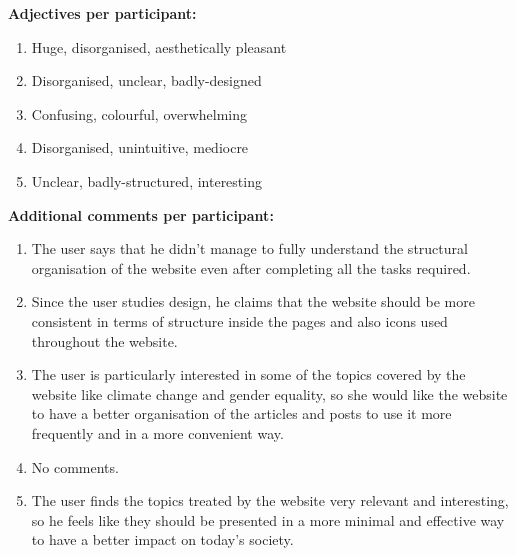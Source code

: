 \textbf{Adjectives per participant:}
\begin{enumerate}
	\item Huge, disorganised, aesthetically pleasant
	\item Disorganised, unclear, badly-designed
	\item Confusing, colourful, overwhelming
	\item Disorganised, unintuitive, mediocre
	\item Unclear, badly-structured, interesting
\end{enumerate}

\vspace{0.25cm}

\textbf{Additional comments per participant:}
\begin{enumerate}
	\item The user says that he didn't manage to fully understand the structural organisation of the website even after completing all the tasks required.
	\item Since the user studies design, he claims that the website should be more consistent in terms of structure inside the pages and also icons used throughout the website.
	\item The user is particularly interested in some of the topics covered by the website like climate change and gender equality, so she would like the website to have a better organisation of the articles and posts to use it more frequently and in a more convenient way.
	\item No comments.
	\item The user finds the topics treated by the website very relevant and interesting, so he feels like they should be presented in a more minimal and effective way to have a better impact on today's society.
\end{enumerate}